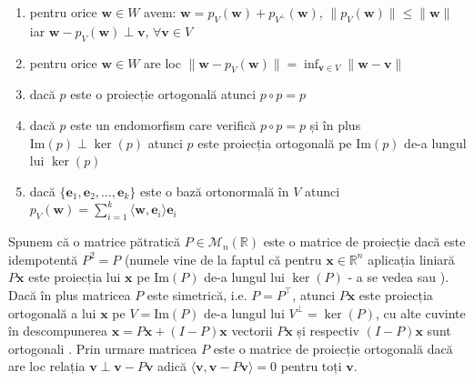 \documentclass[]{article}
\begin{document}
\begin{enumerate}
\def\labelenumi{\roman{enumi})}
\item
  pentru orice \(\boldsymbol w\in W\) avem:
  \(\boldsymbol w = p_V(\boldsymbol w) + p_{V^\perp}(\boldsymbol w)\),
  \(\lVert p_V(\boldsymbol w)\rVert \leq \lVert \boldsymbol w\rVert\)
  iar \(\boldsymbol w - p_{V}(\boldsymbol w) \perp \boldsymbol v\),
  \(\forall \boldsymbol v \in V\)
\item
  pentru orice \(\boldsymbol w\in W\) are loc
  \(\lVert \boldsymbol w - p_V(\boldsymbol w)\rVert = \inf_{\boldsymbol v\in V}\lVert \boldsymbol w - \boldsymbol v\rVert\)
\item
  dacă \(p\) este o proiecție ortogonală atunci \(p\circ p = p\)
\item
  dacă \(p\) este un endomorfism care verifică \(p\circ p = p\) și în
  plus \(\textrm{Im}(p)\perp \ker(p)\) atunci \(p\) este proiecția
  ortogonală pe \(\textrm{Im}(p)\) de-a lungul lui \(\ker(p)\)
\item
  dacă \(\{\boldsymbol e_1, \boldsymbol e_2, \ldots, \boldsymbol e_k\}\)
  este o bază ortonormală în \(V\) atunci
  \(p_V(\boldsymbol w) = \sum_{i = 1}^{k}\langle \boldsymbol w, \boldsymbol e_i\rangle \boldsymbol e_i\)
\end{enumerate}

Spunem că o matrice pătratică \(P\in\mathcal{M}_{n}(\mathbb{R})\) este o
matrice de proiecție dacă este idempotentă \(P^2 = P\) (numele vine de
la faptul că pentru \(\boldsymbol x\in\mathbb{R}^n\) aplicația liniară
\(P\boldsymbol x\) este proiecția lui \(\boldsymbol x\) pe
\(\mathrm{Im}(P)\) de-a lungul lui \(\ker(P)\) - a se vedea
\citep[Capitolul 1, Secțiunea 5.2]{Turtoi2000} sau \citep[Capitolul
2]{Yanai2011}). Dacă în plus matricea \(P\) este simetrică, i.e.
\(P = P^\intercal\), atunci \(P\boldsymbol x\) este proiecția ortogonală
a lui \(\boldsymbol x\) pe \(V = \mathrm{Im}(P)\) de-a lungul lui
\(V^\perp = \ker(P)\), cu alte cuvinte în descompunerea
\(\boldsymbol x = P\boldsymbol x + (I - P)\boldsymbol x\) vectorii
\(P\boldsymbol x\) și respectiv \((I - P)\boldsymbol x\) sunt ortogonali
\citep[Capitolul 2, Secțiunea 2.2]{Yanai2011}. Prin urmare matricea
\(P\) este o matrice de proiecție ortogonală dacă are loc relația
\(\boldsymbol v\perp \boldsymbol v - P\boldsymbol v\) adică
\(\langle\boldsymbol v, \boldsymbol v - P\boldsymbol v\rangle = 0\)
pentru toți \(\boldsymbol v\).
\end{document}
